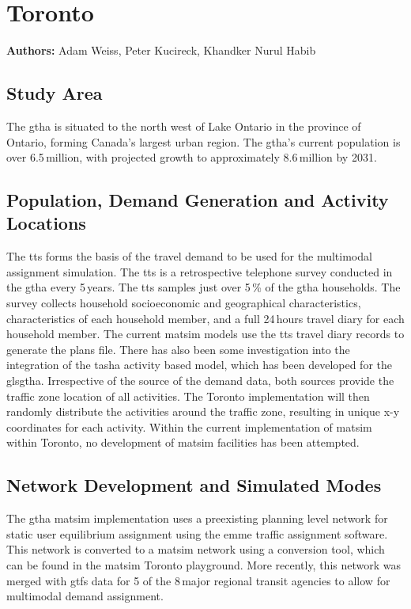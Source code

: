 \section{Toronto}
\label{sec:toronto}
\hfill \textbf{Authors:} Adam Weiss, Peter Kucireck, Khandker Nurul Habib

\subsection{Study Area}
The \gls{gtha} is situated to the north west of Lake Ontario in the province of Ontario, forming Canada’s largest urban region. The \gls{gtha}’s current population is over 6.5\,million, with projected growth to approximately 8.6\,million by 2031. 

\subsection{Population, Demand Generation and Activity Locations}
The \gls{tts} forms the basis of the travel demand to be used for the \gls{multimodal} assignment simulation. The \gls{tts} is a retrospective telephone survey conducted in the \gls{gtha} every 5\,years. The \gls{tts} samples just over 5\,\% of the \gls{gtha} households. The survey collects household socioeconomic and geographical characteristics, characteristics of each household member, and a full 24\,hours travel diary for each household member. The current \gls{matsim} models use the \gls{tts} travel diary records to generate the plans file. There has also been some investigation into the integration of the \gls{tasha} activity based model, which has been developed for the gls{gtha}. Irrespective of the source of the demand data, both sources provide the traffic zone location of all activities. The Toronto implementation will then randomly distribute the activities around the traffic zone, resulting in unique x-y coordinates for each activity. Within the current implementation of \gls{matsim} within Toronto, no development of \gls{matsim} facilities has been attempted.

\subsection{Network Development and Simulated Modes}  
The \gls{gtha} \gls{matsim} implementation uses a preexisting planning level network for static user equilibrium assignment using the \gls{emme} traffic assignment software. This network is converted to a \gls{matsim} network using a conversion tool, which can be found in the \gls{matsim} Toronto playground. More recently, this network was merged with \gls{gtfs} data for 5 of the 8\,major regional transit agencies to allow for \gls{multimodal} demand assignment.  

